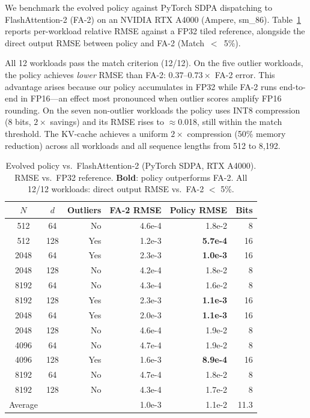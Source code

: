 \documentclass[10pt,twocolumn]{article}
\begin{document}
We benchmark the evolved policy against PyTorch SDPA dispatching to
FlashAttention-2 (FA-2) on an NVIDIA RTX A4000 (Ampere, sm\_86).
Table~\ref{tab:fa2_comparison} reports per-workload relative RMSE
against a FP32 tiled reference, alongside the direct output RMSE
between policy and FA-2 (Match~$<$~5\%).

All 12 workloads pass the match criterion (12/12). On the five
outlier workloads, the policy achieves \emph{lower} RMSE than FA-2:
$0.37$--$0.73\times$ FA-2 error. This advantage arises because our
policy accumulates in FP32 while FA-2 runs end-to-end in FP16---an
effect most pronounced when outlier scores amplify FP16 rounding. On
the seven non-outlier workloads the policy uses INT8 compression
(8 bits, $2\times$ savings) and its RMSE rises to $\approx$0.018,
still within the match threshold. The KV-cache achieves a uniform
$2\times$ compression (50\% memory reduction) across all workloads and
all sequence lengths from 512 to 8{,}192.

\begin{table}[tbp]
\centering
\caption{Evolved policy vs.\ FlashAttention-2 (PyTorch SDPA,
  RTX A4000). RMSE vs.\ FP32 reference.
  \textbf{Bold}: policy outperforms FA-2.
  All 12/12 workloads: direct output RMSE vs.\ FA-2 $<$ 5\%.}
\label{tab:fa2_comparison}
\small
\begin{tabular}{ccrrrr}
\toprule
$N$ & $d$ & Outliers & FA-2 RMSE & Policy RMSE & Bits \\
\midrule
  512 &  64 & No  & 4.6e-4 & 1.8e-2 &  8 \\
\rowcolor{gray!15}
  512 & 128 & Yes & 1.2e-3 & \textbf{5.7e-4} & 16 \\
\rowcolor{gray!15}
 2048 &  64 & Yes & 2.3e-3 & \textbf{1.0e-3} & 16 \\
 2048 & 128 & No  & 4.2e-4 & 1.8e-2 &  8 \\
 8192 &  64 & No  & 4.3e-4 & 1.6e-2 &  8 \\
\rowcolor{gray!15}
 8192 & 128 & Yes & 2.3e-3 & \textbf{1.1e-3} & 16 \\
\rowcolor{gray!15}
 2048 &  64 & Yes & 2.0e-3 & \textbf{1.1e-3} & 16 \\
 2048 & 128 & No  & 4.6e-4 & 1.9e-2 &  8 \\
 4096 &  64 & No  & 4.7e-4 & 1.9e-2 &  8 \\
\rowcolor{gray!15}
 4096 & 128 & Yes & 1.6e-3 & \textbf{8.9e-4} & 16 \\
 8192 &  64 & No  & 4.7e-4 & 1.8e-2 &  8 \\
 8192 & 128 & No  & 4.3e-4 & 1.7e-2 &  8 \\
\midrule
Average &  &  & 1.0e-3 & 1.1e-2 & 11.3 \\
\bottomrule
\end{tabular}
\end{table}
\end{document}
